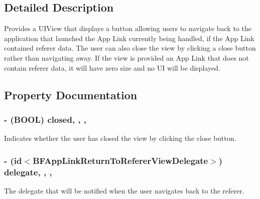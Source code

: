 \subsection{Detailed Description}
Provides a U\+I\+View that displays a button allowing users to navigate back to the application that launched the App Link currently being handled, if the App Link contained referer data. The user can also close the view by clicking a close button rather than navigating away. If the view is provided an App Link that does not contain referer data, it will have zero size and no U\+I will be displayed. 

\subsection{Property Documentation}
\hypertarget{interface_b_f_app_link_return_to_referer_view_acb041d67e8a2f626ae99a788aa8d1da4}{}
\subsubsection[{closed}]{\setlength{\rightskip}{0pt plus 5cm}-\/ (B\+O\+O\+L) closed\hspace{0.3cm}{\ttfamily [read]}, {\ttfamily [write]}, {\ttfamily [nonatomic]}, {\ttfamily [assign]}}\label{interface_b_f_app_link_return_to_referer_view_acb041d67e8a2f626ae99a788aa8d1da4}
Indicates whether the user has closed the view by clicking the close button. \hypertarget{interface_b_f_app_link_return_to_referer_view_aca2022c4be7763b7450d2a39df24b95a}{}
\subsubsection[{delegate}]{\setlength{\rightskip}{0pt plus 5cm}-\/ (id$<${\bf B\+F\+App\+Link\+Return\+To\+Referer\+View\+Delegate}$>$) delegate\hspace{0.3cm}{\ttfamily [read]}, {\ttfamily [write]}, {\ttfamily [nonatomic]}, {\ttfamily [weak]}}\label{interface_b_f_app_link_return_to_referer_view_aca2022c4be7763b7450d2a39df24b95a}
The delegate that will be notified when the user navigates back to the referer. \hypertarget{interface_b_f_app_link_return_to_referer_view_a640b53f5c49f1bfb5f11a81a8f7381af}{}
